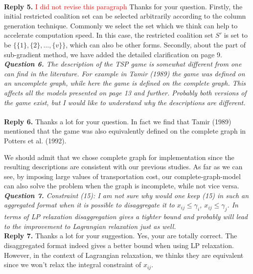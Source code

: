\documentclass[11pt]{article}
\begin{document}
~\\[2mm]
\noindent \textbf{Reply 5.}
\textcolor{red}{I did not revise this paragraph}
Thanks for your question. Firstly, the initial restricted coalition set can be selected arbitrarily according to the column generation technique. Commonly we select the set which we think can help to accelerate computation speed. In this case, the restricted coalition set $S'$ is set to be $\{\{1\},\{2\},\ldots, \{v\}\}$, which can also be other forms.
Secondly, about the part of sub-gradient method, we have added the detailed clarification on page 9.
\\[4mm]
%
%
\noindent \textit{\textbf{Question 6.}
The description of the TSP game is somewhat different from one can find in the literature. For example in Tamir (1989) the game was defined on an uncomplete graph, while here the game is defined on the complete graph. This affects all the models presented on page 13 and further. Probably both versions of the game exist, but I would like to understand why the descriptions are different.}
~\\[2mm]
\noindent \textbf{Reply 6.}
Thanks a lot for your question. 
In fact we find that Tamir (1989) mentioned that the game was also equivalently defined on the complete graph in Potters et al. (1992).

We should admit that we chose complete graph for implementation since the resulting descriptions are consistent with our previous studies.
As far as we can see, by imposing large values of transportation cost, our complete-graph-model can also solve the problem when the graph is incomplete, while not vice versa.
\\[4mm]
\noindent \textit{\textbf{Question 7.}
Constraint (15): I am not sure why would one keep (15) in such an aggregated format when it is possible to disaggregate it to $x_{ij} \leq \gamma_i$, $x_{ij} \leq \gamma_j$. In terms of LP relaxation disaggregation gives a tighter bound and probably will lead to the improvement to Lagrangian relaxation just as well.}
\\[2mm]
\noindent \textbf{Reply 7.}
Thanks a lot for your suggestion.
Yes, your are totally correct. The disaggregated format indeed gives a better bound when using LP relaxation.
However, in the context of Lagrangian relaxation, we thinks they are equivalent since we won't relax the integral constraint of $x_{ij}$.
\end{document}

